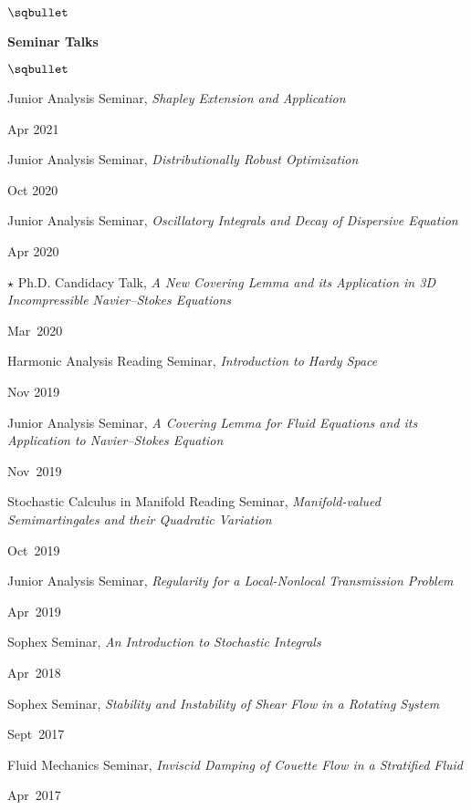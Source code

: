 \documentclass[margin,line]{res}
\newenvironment{list2}{
  \begin{list}{$\sqbullet$}{%
      \setlength{\itemsep}{0.05in}
      \setlength{\parsep}{0in} 
      \setlength{\parskip}{0in}
      \setlength{\topsep}{0.1in} 
      \setlength{\partopsep}{-0.07in} 
      \setlength{\leftmargin}{0.15in}
    }}
{\end{list}}
\begin{document}
\begin{resume}
\begin{list2}
\end{list2}

{\bf Seminar Talks}

\begin{list2}
    
    \item Junior Analysis Seminar,
    \textit{Shapley Extension and Application}
    \strut \hfill Apr 2021
    
    \item Junior Analysis Seminar, 
    \textit{Distributionally Robust Optimization}
    \strut \hfill Oct 2020
    
    \item Junior Analysis Seminar, 
    \textit{Oscillatory Integrals and Decay of Dispersive Equation }
    \strut \hfill Apr 2020

    \item[$\star$] Ph.D. Candidacy Talk,
    \textit{A New Covering Lemma and its Application in 3D Incompressible Navier--Stokes Equations}
    \strut \hfill Mar~2020

    \item Harmonic Analysis Reading Seminar,
    \textit{Introduction to Hardy Space}
    \strut \hfill Nov 2019
    
    \item Junior Analysis Seminar, 
    \textit{A Covering Lemma for Fluid Equations and its Application to Navier--Stokes Equation} \strut \hfill Nov~2019
    
    \item Stochastic Calculus in Manifold Reading Seminar, 
    \textit{Manifold-valued Semimartingales and their Quadratic Variation}
    \strut \hfill Oct~2019
    
    \item Junior Analysis Seminar, 
    \textit{Regularity for a Local-Nonlocal Transmission Problem}
    \strut \hfill Apr~2019
    
    \item Sophex Seminar, 
    \textit{An Introduction to Stochastic Integrals} 
    \strut \hfill Apr~2018
    
    \item Sophex Seminar, 
    \textit{Stability and Instability of Shear Flow in a Rotating System\\} 
    \strut \hfill Sept~2017
    
    \item Fluid Mechanics Seminar, 
    \textit{Inviscid Damping of Couette Flow in a Stratified Fluid} 
    \strut \hfill Apr~2017 
    

\end{list2}
\end{resume}
\end{document}
